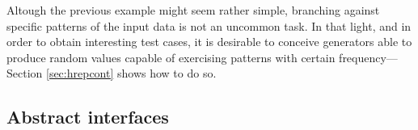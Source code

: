 


Altough the previous example might seem rather simple, branching against
specific patterns of the input data is not an uncommon task.
%
In that light, and in order to obtain interesting test cases, it is desirable to
conceive generators able to produce random values capable of exercising patterns
with certain frequency---Section \ref{sec:hrepcont} shows how to do so.



\subsection{Abstract interfaces}

